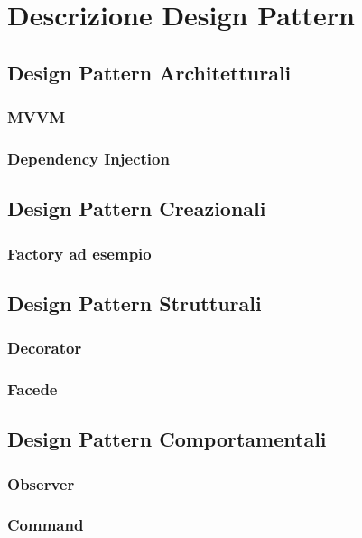 \section{Descrizione Design Pattern }

	\subsection{Design Pattern Architetturali}
	
		\subsubsection{MVVM}
		\subsubsection{Dependency Injection}

	\subsection{Design Pattern Creazionali}
	
		\subsubsection{Factory ad esempio}
		
	\subsection{Design Pattern Strutturali}

		\subsubsection{Decorator}
		\subsubsection{Facede}
	
	\subsection{Design Pattern Comportamentali}

		\subsubsection{Observer}
		\subsubsection{Command}	